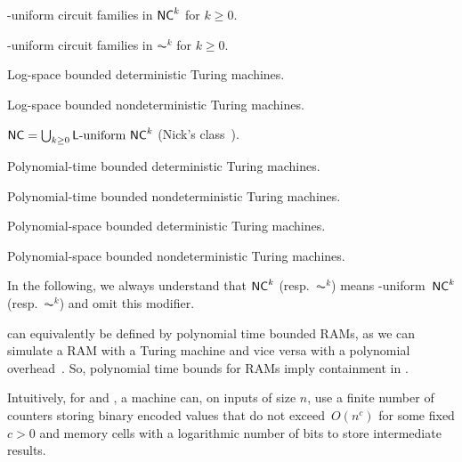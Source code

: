 \begin{description}[style=multiline,leftmargin=3cm,labelwidth=2.2cm,align=left]
	
	\item[\LOGSPACE-uniform $\NC^k$]\label{def:ACkNCk}
	\LOGSPACE-uniform circuit families in $\NC^k$ for $k \ge 0$.
	
	\item[\LOGSPACE-uniform $\AC^k$]
	\LOGSPACE-uniform circuit families in $\AC^k$ for $k \ge 0$.
	
	\item[\LOGSPACE]\label{def:L}
	Log-space bounded deterministic Turing machines.
	
	\item[\NL]\label{def:NL}
	Log-space bounded nondeterministic Turing machines.
	
	\item[\NC]\label{def:NC} 
	$\NC = \bigcup_{k \ge 0} \text{\LOGSPACE-uniform $\NC^k$}$ (Nick's class~\cite{DBLP:journals/iandc/Cook85}).
	
	\item[\PTIME]\label{def:P}
	Polynomial-time bounded deterministic Turing machines.
	
	\item[\NP]\label{def:NP}
	Polynomial-time bounded nondeterministic Turing machines.
	
	\item[\PSPACE]\label{def:PSPACE}
	Polynomial-space bounded deterministic Turing machines.
	
	\item[\NPSPACE]\label{def:NPSPACE}
	Polynomial-space bounded nondeterministic Turing machines.	
\end{description}
 
\label{prelim:rem:circuit-uniform}
In the following, we always understand that $\NC^k$ (resp.~$\AC^k$) means \LOGSPACE-uniform~$\NC^k$ (resp.~$\AC^k$) and omit this modifier. 

\PTIME can equivalently be defined by polynomial time bounded RAMs,
as we can simulate a RAM with a Turing machine and vice versa with 
a polynomial overhead~\cite{DBLP:journals/jcss/CookR73}. 
So, polynomial time bounds for RAMs imply containment in \PTIME.

Intuitively, for \LOGSPACE and \NL, a machine can, on inputs of size $n$, use a finite number of counters storing binary encoded
values that do not exceed~$O(n^c)$ for some fixed $c > 0$
and memory cells with a logarithmic number of bits %
to store intermediate results.

